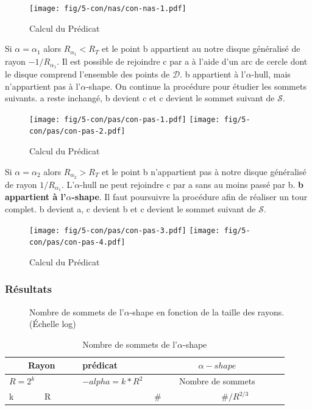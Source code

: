 \begin{figure}[H]
  \centering
  \texttt{[image: fig/5-con/nas/con-nas-1.pdf]}
  \caption{Calcul du Prédicat}
\end{figure}

Si $\alpha = \alpha_{1}$ alors \textbf{$R_{\alpha_{1}} < R_T$} et le point b appartient au notre disque généralisé de rayon $-1/R_{\alpha_{1}}$. Il est possible de rejoindre c par a à l'aide d'un arc de cercle dont le disque comprend l'ensemble des points de $\mathcal{D}$. b appartient à l'$\alpha$-hull, mais n'appartient pas à l'$\alpha$-shape. On continue la procédure pour étudier les sommets suivants. a reste inchangé, b devient c et c devient le sommet suivant de $\mathcal{S}$.

\begin{figure}[H]
  \centering
  \texttt{[image: fig/5-con/pas/con-pas-1.pdf]}
  \texttt{[image: fig/5-con/pas/con-pas-2.pdf]}
  \caption{Calcul du Prédicat}
\end{figure}

Si $\alpha = \alpha_{2}$ alors \textbf{$R_{\alpha_{2}} > R_T$} et le point b n'appartient pas à notre disque généralisé de rayon $1/R_{\alpha_{1}}$. L'$\alpha$-hull ne peut rejoindre c par a sans au moins passé par b. \textbf{b appartient à l'$\alpha$-shape}. Il faut poursuivre la procédure afin de réaliser un tour complet. b devient a, c devient b et c devient le sommet suivant de $\mathcal{S}$.\\

\begin{figure}[H]
  \centering
  \texttt{[image: fig/5-con/pas/con-pas-3.pdf]}
  \texttt{[image: fig/5-con/pas/con-pas-4.pdf]}
  \caption{Calcul du Prédicat}
\end{figure}

\subsubsection{Résultats}

\begin{figure}[H]
  \centering
  \caption{Nombre de sommets de l'$\alpha$-shape en fonction de la taille des rayons. (Échelle log)}
\end{figure}


\begin{table}[H]
  \begin{tabular}{|p{0.09\linewidth}|p{0.13\linewidth}||p{0.23\linewidth}||p{0.23\linewidth}|p{0.23\linewidth}|}
    \hline
    \multicolumn{2}{|c||}{Rayon} & prédicat               & \multicolumn{2}{|c|}{$\alpha-shape$} \\  \hline 
    $R=2^k$  &                   & $-alpha = k*R^{2}$ & \multicolumn{2}{|c|}{Nombre de sommets} \\ \hline
    k        & R                 &                        & \# & $\# / R^{2/3}$ \\ 
    \hline
    
    \hline
  \end{tabular} 
  \caption{Nombre de sommets de l'$\alpha$-shape}
\end{table}
